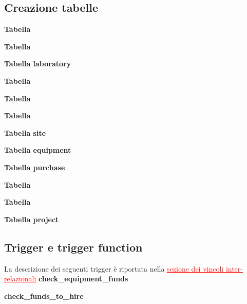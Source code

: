 \subsection{Creazione tabelle}
\noindent \textbf{Tabella \baseemp}
\bigskip

\noindent \textbf{Tabella \careerlog}
\bigskip

\noindent \textbf{Tabella laboratory}
\bigskip

\noindent \textbf{Tabella \takepart}
\bigskip

\noindent \textbf{Tabella \projectsalaried}
\bigskip

\noindent \textbf{Tabella \workson}
\bigskip

\noindent \textbf{Tabella site}
\bigskip

\noindent \textbf{Tabella equipment}
\bigskip

\noindent \textbf{Tabella purchase}
\bigskip

\noindent \textbf{Tabella \worksat}
\bigskip

\noindent \textbf{Tabella \equipmentrequest}
\bigskip

\noindent \textbf{Tabella project}
\bigskip

\subsection{Trigger e trigger function}\label{trigger}
La descrizione dei seguenti trigger è riportata nella \hyperref[vincoli_inter_relazionali]{\textcolor{red}{\underline{sezione dei vincoli inter-relazionali}}}\meskip
\noindent \textbf{check\_equipment\_funds}
\bigskip

\noindent \textbf{check\_funds\_to\_hire}
\bigskip

